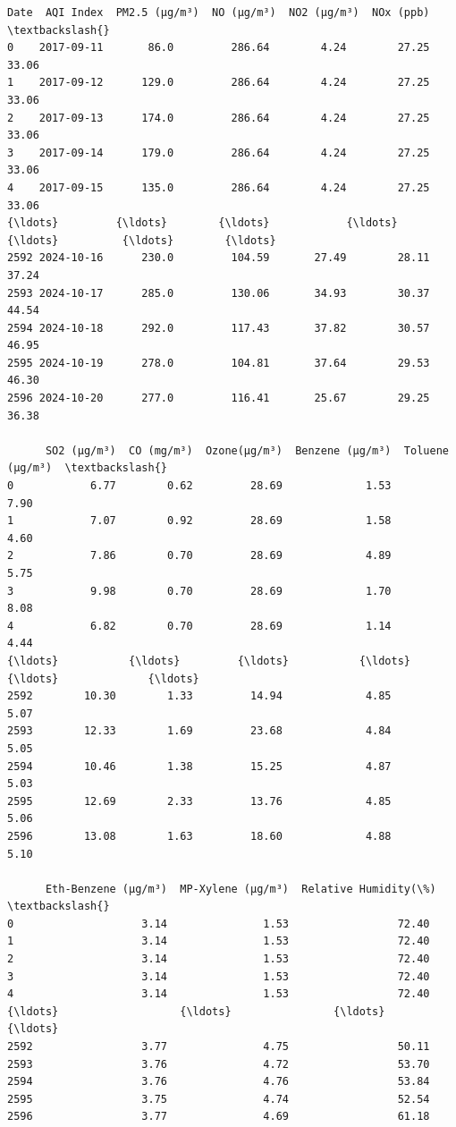 \documentclass[11pt]{article}
\makeatletter
\newcommand{\boxspacing}{\kern\kvtcb@left@rule\kern\kvtcb@boxsep}
\newcommand{\prompt}[4]{
        {\ttfamily\llap{{\color{#2}[#3]:\hspace{3pt}#4}}\vspace{-\baselineskip}}
    }
\makeatother
\begin{document}
            \begin{tcolorbox}[breakable, size=fbox, boxrule=.5pt, pad at break*=1mm, opacityfill=0]
\prompt{Out}{outcolor}{16}{\boxspacing}
\begin{Verbatim}[commandchars=\\\{\}]
           Date  AQI Index  PM2.5 (µg/m³)  NO (µg/m³)  NO2 (µg/m³)  NOx (ppb)  \textbackslash{}
0    2017-09-11       86.0         286.64        4.24        27.25      33.06
1    2017-09-12      129.0         286.64        4.24        27.25      33.06
2    2017-09-13      174.0         286.64        4.24        27.25      33.06
3    2017-09-14      179.0         286.64        4.24        27.25      33.06
4    2017-09-15      135.0         286.64        4.24        27.25      33.06
{\ldots}         {\ldots}        {\ldots}            {\ldots}         {\ldots}          {\ldots}        {\ldots}
2592 2024-10-16      230.0         104.59       27.49        28.11      37.24
2593 2024-10-17      285.0         130.06       34.93        30.37      44.54
2594 2024-10-18      292.0         117.43       37.82        30.57      46.95
2595 2024-10-19      278.0         104.81       37.64        29.53      46.30
2596 2024-10-20      277.0         116.41       25.67        29.25      36.38

      SO2 (µg/m³)  CO (mg/m³)  Ozone(µg/m³)  Benzene (µg/m³)  Toluene (µg/m³)  \textbackslash{}
0            6.77        0.62         28.69             1.53             7.90
1            7.07        0.92         28.69             1.58             4.60
2            7.86        0.70         28.69             4.89             5.75
3            9.98        0.70         28.69             1.70             8.08
4            6.82        0.70         28.69             1.14             4.44
{\ldots}           {\ldots}         {\ldots}           {\ldots}              {\ldots}              {\ldots}
2592        10.30        1.33         14.94             4.85             5.07
2593        12.33        1.69         23.68             4.84             5.05
2594        10.46        1.38         15.25             4.87             5.03
2595        12.69        2.33         13.76             4.85             5.06
2596        13.08        1.63         18.60             4.88             5.10

      Eth-Benzene (µg/m³)  MP-Xylene (µg/m³)  Relative Humidity(\%)  \textbackslash{}
0                    3.14               1.53                 72.40
1                    3.14               1.53                 72.40
2                    3.14               1.53                 72.40
3                    3.14               1.53                 72.40
4                    3.14               1.53                 72.40
{\ldots}                   {\ldots}                {\ldots}                   {\ldots}
2592                 3.77               4.75                 50.11
2593                 3.76               4.72                 53.70
2594                 3.76               4.76                 53.84
2595                 3.75               4.74                 52.54
2596                 3.77               4.69                 61.18


\end{Verbatim}
\end{tcolorbox}
\end{document}
